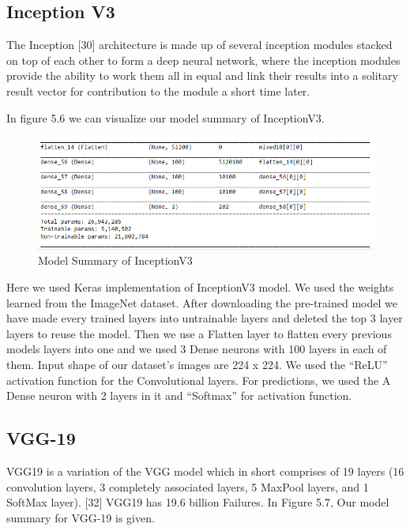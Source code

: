 \subsection{Inception V3}
The Inception [30] architecture is made up of several inception modules stacked on top of each other to form a deep neural network, where the inception modules provide the ability to work them all in equal and link their results into a solitary result vector for contribution to the module a short time later.

\vspace{5mm}
\noindent In figure 5.6 we can visualize our model summary of InceptionV3.

\vspace{5mm}
\begin{figure}[hbt!]
\centering
\includegraphics[scale=0.75]{images/fig-11.png}
\caption{Model Summary of InceptionV3}
\label{fig:x Model Summary of InceptionV3}
\end{figure}

\vspace{5mm}
\noindent Here we used Keras implementation of InceptionV3 model. We used the weights learned from the ImageNet dataset. After downloading the pre-trained model we have made every trained layers into untrainable layers and deleted the top 3 layer layers to reuse the model. Then we use a Flatten layer to flatten every previous models layers into one and we used 3 Dense neurons with 100 layers in each of them. Input shape of our dataset's images are 224 x 224. We used the “ReLU” activation function for the Convolutional layers. For predictions, we used the A Dense neuron with 2 layers in it and “Softmax” for activation function.

\subsection{VGG-19}
VGG19 is a variation of the VGG model which in short comprises of 19 layers (16 convolution layers, 3 completely associated layers, 5 MaxPool layers, and 1 SoftMax layer). [32] VGG19 has 19.6 billion Failures. In Figure 5.7, Our model summary for VGG-19 is given.


